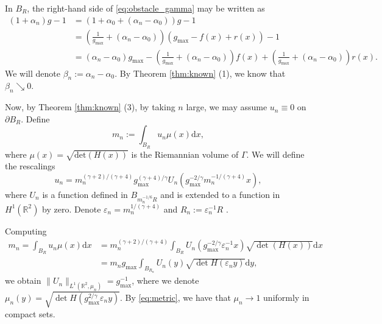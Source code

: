 \documentclass[10pt,a4paper]{article}
\newcommand{\gmax}{g_{\mathrm{max}}}
\newcommand{\RR}{\mathbb{R}}
\numberwithin{equation}{section}
\begin{document}
In $B_{R}$, the right-hand side of \eqref{eq:obstacle_gamma} may be written as
\begin{align*}
	 (1+\alpha_n) g - 1  &=  (1 + \alpha_0 + (\alpha_n - \alpha_0))g - 1  \\
		      &=  \left(\frac{1}{\gmax} + (\alpha_n - \alpha_0)\right)\left( \gmax - f(x) + r(x) \right)  - 1  \\
		      &=   (\alpha_n - \alpha_0) \gmax - \left(\frac{1}{\gmax} + (\alpha_n - \alpha_0)\right) f(x) + \left(\frac{1}{\gmax} + (\alpha_n - \alpha_0)\right) r(x) .
\end{align*}
We will denote $\beta_n := \alpha_n - \alpha_0$. By Theorem \ref{thm:known} (1), we know that $\beta_n \searrow 0$.

Now, by Theorem \ref{thm:known} (3), by taking $ n $ large, we may assume $u_n \equiv 0$ on $ \partial B_R $. Define
\[m_n := \int_{B_R} u_n \mu(x)\mathrm{d}x ,\]
where $\mu(x) = \sqrt{\mathrm{det}(H(x))}$ is the Riemannian volume of $ \Gamma $. We will define the rescalings
\begin{equation}
\label{eq:nondeg_rescaling}
u_n = m_n^{(\gamma + 2)/(\gamma + 4)} \gmax^{(\gamma + 4)/\gamma}U_{n} (\gmax^{-2/\gamma} m_n^{-1/(\gamma + 4)} x),
\end{equation}
where $U_n$ is a function defined in $B_{m_n^{-1/6}R}$ and is extended to a function in $H^{1}(\RR^{2})$ by zero. Denote $ \varepsilon_n = m_n^{1/(\gamma + 4)} $ and $R_n := \varepsilon_n^{-1}R$ .

Computing
\begin{align*}
	m_n = \int_{B_R} u_n \mu(x) \mathrm{d}x &= m_n^{(\gamma + 2)/(\gamma + 4)}\int_{B_R} U_n(\gmax^{-2/\gamma} \varepsilon_n^{-1} x) \sqrt{\det (H(x))} \mathrm{d}x \\
					  &= m_n \gmax \int_{B_{R_n}} U_n(y) \sqrt{\det H(\varepsilon_n y)} \mathrm{d}y,
\end{align*}
we obtain $\| U_n\|_{L^{1}(\RR^{2},\mu_n)} = \gmax^{-1}$, where we denote $ \mu_n(y) = \sqrt{\det H(\gmax^{2/\gamma} \varepsilon_n y)} $. By \eqref{eq:metric}, we have that $ \mu_n \rightarrow 1$ uniformly in compact sets. 
\end{document}
